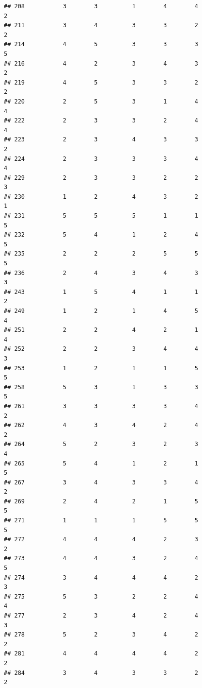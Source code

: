 \documentclass[
]{article}
\begin{document}
\begin{verbatim}
## 208           3        3          1        4        4               2
## 211           3        4          3        3        2               2
## 214           4        5          3        3        3               5
## 216           4        2          3        4        3               2
## 219           4        5          3        3        2               2
## 220           2        5          3        1        4               4
## 222           2        3          3        2        4               4
## 223           2        3          4        3        3               2
## 224           2        3          3        3        4               4
## 229           2        3          3        2        2               3
## 230           1        2          4        3        2               1
## 231           5        5          5        1        1               5
## 232           5        4          1        2        4               5
## 235           2        2          2        5        5               5
## 236           2        4          3        4        3               3
## 243           1        5          4        1        1               2
## 249           1        2          1        4        5               4
## 251           2        2          4        2        1               4
## 252           2        2          3        4        4               3
## 253           1        2          1        1        5               5
## 258           5        3          1        3        3               5
## 261           3        3          3        3        4               2
## 262           4        3          4        2        4               2
## 264           5        2          3        2        3               4
## 265           5        4          1        2        1               5
## 267           3        4          3        3        4               2
## 269           2        4          2        1        5               5
## 271           1        1          1        5        5               5
## 272           4        4          4        2        3               2
## 273           4        4          3        2        4               5
## 274           3        4          4        4        2               3
## 275           5        3          2        2        4               4
## 277           2        3          4        2        4               3
## 278           5        2          3        4        2               2
## 281           4        4          4        4        2               2
## 284           3        4          3        3        2               2

\end{verbatim}
\end{document}
